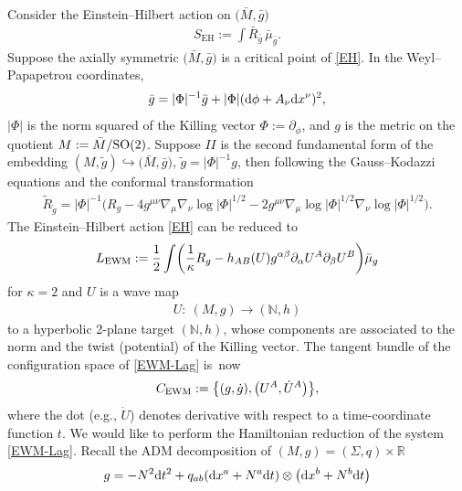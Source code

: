 \documentclass[11pt]{article}
\numberwithin{equation}{section}
\def\ptl{\partial}%
\def\grad{{\nabla}}%
\def\halb{\frac{1}{2}}%
\def \a{\alpha}
\def \b {\beta}
\renewcommand{\a}{\alpha}
\renewcommand{\b}{\beta}
\numberwithin{equation}{section}
\begin{document}
Consider the Einstein--Hilbert action on $\bigl(\bar{M}, \bar{g}\bigr)$
\begin{align} \label{EH}
S_{\text{EH}} := \int \bar{R}_{\bar{g}} \, \bar{\mu}_{\bar{g}}.
\end{align}
Suppose the axially symmetric $\bigl(\bar{M}, \bar{g}\bigr)$ is a critical point of \eqref{EH}. In the Weyl--Papapetrou coordinates,
\begin{align*}
\bar{g} = \vert \Phi \vert^{-1} \bar{g} + \vert \Phi \vert ({\rm d}\phi + A_\nu {\rm d}x^\nu)^2,
\end{align*}
$ \vert \Phi \vert$ is the norm squared of the Killing vector $ \Phi := \ptl_\phi$, and $g$ is the metric on the quotient $M := \bar{M}/{\rm SO}(2)$. Suppose $II$ is the second fundamental form of the embedding $(M, \tilde{g}) \hookrightarrow \bigl(\bar{M}, \bar{g}\bigr)$, $\tilde{g} = \vert \Phi \vert^{-1} g$, then following the Gauss--Kodazzi equations and the conformal transformation
\begin{align*}
\tilde{R}_{\tilde{g}} = \vert \Phi \vert^{-1} \bigl(R_g -4 g^{\mu \nu} \grad_\mu \grad_\nu \log \vert \Phi \vert^{1/2} - 2 g^{\mu \nu} \grad_\mu \log \vert \Phi \vert^{1/2} \grad_\nu \log \vert \Phi \vert^{1/2}\bigr).
\end{align*}
The Einstein--Hilbert action \eqref{EH} can be reduced to
\begin{align}\label{EWM-Lag}
L_{{\rm EWM}} := \halb \int \biggl(\frac{1}{\kappa} R_g - h_{AB} (U) g^{\a \b} \ptl_\a U^A \ptl_\b U^B \biggr) \bar{\mu}_g
\end{align}
for $\kappa =2$ and $U$ is a wave map
\begin{align*}
U \colon\ (M, g) \to (\mathbb{N}, h)
\end{align*}
to a hyperbolic 2-plane target $(\mathbb{N}, h)$, whose components are associated to the norm and the twist (potential) of the Killing vector. The tangent bundle of the configuration space of \eqref{EWM-Lag} is~now
\begin{align*}
C_{{\rm EWM}} := \bigl\{ (g, \dot{g}), \bigl(U^A, \dot{U}^A\bigr) \bigr\},
\end{align*}
where the dot \big(e.g., $\dot{U}$\big) denotes derivative with respect to a time-coordinate function $t$.
We would like to perform the Hamiltonian reduction of the system \eqref{EWM-Lag}. Recall the ADM decomposition of $(M, g) = (\Sigma, q) \times \mathbb{R}$
\begin{align*}
g = -N^2 {\rm d}t^2 + q_{ab} ({\rm d}x^a + N^a {\rm d}t) \otimes \bigl({\rm d}x^b + N^b {\rm d}t\bigr)
\end{align*}
\end{document}
